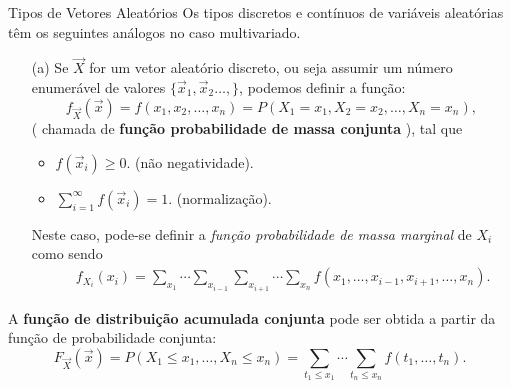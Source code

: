 \begin{frame}
\frametitle{}
\begin{block}{Tipos de Vetores Aleatórios}
Os tipos discretos e contínuos de variáveis aleatórias têm os seguintes análogos no caso multivariado.
\begin{enumerate}
\item[(a)] Se $\vec{X}$ for um vetor aleatório discreto, ou seja assumir um
número enumerável de valores $\{\vec{x}_1,\vec{x}_2\ldots,\}$, podemos definir a função:
\[
f_{\Vec{X}}(\Vec{x}) = f(x_1, x_2, \ldots, x_n) = P(X_1 = x_1, X_2 = x_2, \ldots, X_n = x_n),
\]
( chamada de \textbf{função probabilidade de massa conjunta} ),
tal que
\begin{itemize}
\item $f(\vec{x}_i)\geq 0$. (não negatividade).
\item $\sum_{i=1}^{\infty}f(\vec{x}_i)=1$. (normalização).
\end{itemize}
Neste caso, pode-se definir a {\em função probabilidade de massa marginal} de $X_i$ como sendo
\begin{eqnarray}
& & f_{X_i}(x_i)= \sum_{x_1}\cdots\sum_{x_{i-1}}\sum_{x_{i+1}}\cdots\sum_{x_n}f(x_1,\ldots,x_{i-1},x_{i+1},\ldots,x_n).\nonumber
\end{eqnarray}
\end{enumerate}
\end{block}
A \textbf{função de distribuição acumulada conjunta} pode ser obtida a partir da função de probabilidade conjunta:
\[
 F_{\vec{X}}(\vec{x}) = P(X_1 \leq x_1, \ldots, X_n \leq x_n) = \sum_{t_1 \leq x_1} \cdots \sum_{t_n \leq x_n} f(t_1, \ldots, t_n).
\]
\end{frame}




